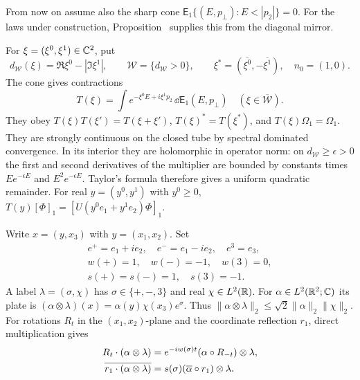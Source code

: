 From now on assume also the sharp cone
$\mathsf E_1\{(E,p_\perp):E<|p_2|\}=0$.
For the laws under construction, Proposition~ supplies this from the diagonal mirror.

For $\xi=(\xi^0,\xi^1)\in\mathbb C^2$, put
\[
 d_{\mathcal W}(\xi)=\Re\xi^0-|\Im\xi^1|,\qquad
 \mathcal W=\{d_{\mathcal W}>0\},\qquad
 \xi^*=(\overline{\xi^0},-\overline{\xi^1}),\quad n_0=(1,0).
\]
The cone  gives contractions
\[
 T(\xi)=\int e^{-\xi^0E+i\xi^1p_2}\,\dd\mathsf E_1(E,p_\perp)
                  \quad(\xi\in\overline{\mathcal W}).
\]
They obey $T(\xi)T(\xi')=T(\xi+\xi')$,
$T(\xi)^*=T(\xi^*)$, and $T(\xi)\Omega_1=\Omega_1$.
They are strongly continuous on the closed tube by spectral
dominated convergence. In its interior they are holomorphic in
operator norm: on $d_{\mathcal W}\ge\epsilon>0$ the first and
second derivatives of the multiplier are bounded by constants
times $E e^{-\epsilon E}$ and $E^2e^{-\epsilon E}$.
Taylor's formula therefore gives a uniform quadratic remainder.
For real $y=(y^0,y^1)$ with $y^0\ge0$,
$T(y)[\Phi]_1=[U(y^0e_1+y^1e_2)\Phi]_1$.

Write $x=(y,x_3)$ with $y=(x_1,x_2)$. Set
\begin{gather*}
 e^+=e_1+ie_2,\quad e^-=e_1-ie_2,\quad e^3=e_3,\\
 w(+)=1,\quad w(-)=-1,\quad w(3)=0,\\
 s(+)=s(-)=1,\quad s(3)=-1.
\end{gather*}
A label $\lambda=(\sigma,\chi)$ has
$\sigma\in\{+,-,3\}$ and real $\chi\in L^2(\mathbb R)$.
For $\alpha\in L^2(\mathbb R^2;\mathbb C)$ its plate is
$(\alpha\otimes\lambda)(x)=\alpha(y)\chi(x_3)e^\sigma$.
Thus $\|\alpha\otimes\lambda\|_2\le\sqrt2\|\alpha\|_2\|\chi\|_2$.
For rotations $R_t$ in the $(x_1,x_2)$-plane and the coordinate
reflection $r_1$, direct multiplication gives
\begin{align}
 R_t\cdot(\alpha\otimes\lambda)
   &=e^{-iw(\sigma)t}(\alpha\circ R_{-t})\otimes\lambda,
                              \label{eq:rotation-plate-actions}\\
 \overline{r_1\cdot(\alpha\otimes\lambda)}
   &=s(\sigma)(\overline\alpha\circ r_1)\otimes\lambda.\notag
\end{align}

